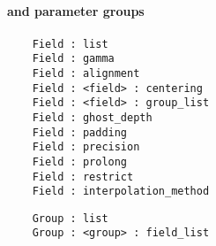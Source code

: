 \NEWSEC

\subsection{\ssParamData}

\begin{frame}[fragile,label=ss-param-data] 
\secframetitle{\ssParamData}
\framesubtitle{ and  parameter groups}

\begin{verbatim}    
    Field : list
    Field : gamma
    Field : alignment
    Field : <field> : centering
    Field : <field> : group_list
    Field : ghost_depth
    Field : padding
    Field : precision
    Field : prolong
    Field : restrict
    Field : interpolation_method
\end{verbatim}
    
\begin{verbatim}    
    Group : list
    Group : <group> : field_list
\end{verbatim}
    
\end{frame}

